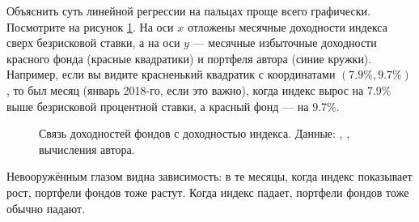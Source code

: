 Объяснить суть линейной регрессии на пальцах проще всего графически. Посмотрите 
на рисунок \ref{fund_regression_figure}. На оси $x$ отложены месячные доходности 
индекса сверх безрисковой ставки, а на оси $y$ --- месячные избыточные 
доходности красного фонда (красные квадратики) и портфеля автора (синие кружки). 
Например, если вы видите красненький квадратик с координатами $(7.9\%, 9.7\%)$, 
то был месяц (январь 2018-го, если это важно), когда индекс вырос на 7.9\% выше 
безрисковой процентной ставки, а красный фонд --- на 9.7\%.

\begin{figure}[ht]
\centering
{}
\caption{Связь доходностей фондов с доходностью индекса. Данные: 
\cite{moex2020}, \cite{cbr2020}, вычисления автора.}
\label{fund_regression_figure}
\end{figure}

Невооружённым глазом видна зависимость: в те месяцы, когда индекс показывает 
рост, портфели фондов тоже растут. Когда индекс падает, портфели фондов тоже 
обычно падают.

